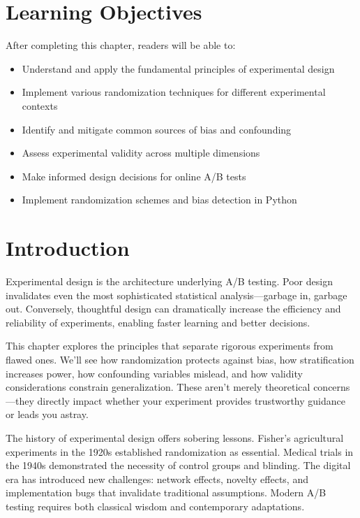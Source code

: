 \section{Learning Objectives}

After completing this chapter, readers will be able to:
\begin{itemize}
    \item Understand and apply the fundamental principles of experimental design
    \item Implement various randomization techniques for different experimental contexts
    \item Identify and mitigate common sources of bias and confounding
    \item Assess experimental validity across multiple dimensions
    \item Make informed design decisions for online A/B tests
    \item Implement randomization schemes and bias detection in Python
\end{itemize}

\section{Introduction}

Experimental design is the architecture underlying A/B testing. Poor design invalidates even the most sophisticated statistical analysis—garbage in, garbage out. Conversely, thoughtful design can dramatically increase the efficiency and reliability of experiments, enabling faster learning and better decisions.

This chapter explores the principles that separate rigorous experiments from flawed ones. We'll see how randomization protects against bias, how stratification increases power, how confounding variables mislead, and how validity considerations constrain generalization. These aren't merely theoretical concerns—they directly impact whether your experiment provides trustworthy guidance or leads you astray.

The history of experimental design offers sobering lessons. Fisher's agricultural experiments in the 1920s established randomization as essential. Medical trials in the 1940s demonstrated the necessity of control groups and blinding. The digital era has introduced new challenges: network effects, novelty effects, and implementation bugs that invalidate traditional assumptions. Modern A/B testing requires both classical wisdom and contemporary adaptations.

